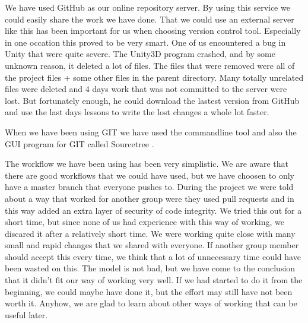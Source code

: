We have used GitHub \cite{GitHub} as our online repository server. By using
this service we could easily share the work we have done. That we could use
an external server like this has been important for us when choosing version
control tool. Especially in one occation this proved to be very smart. One of
us encountered a bug in Unity that were quite severe. The Unity3D program
crashed, and by some unknown reason, it deleted a lot of files. The files that
were removed were all of the project files + some other files in the parent
directory. Many totally unrelated files were deleted and 4 days work that was
not committed to the server were lost. But fortunately enough, he could
download the lastest version from GitHub and use the last days lessons to write
the lost changes a whole lot faster.

When we have been using GIT we have used the commandline tool and also the GUI
program for GIT called Sourcetree \cite{SourceTree}.

The workflow we have been using has been very simplistic. We are aware that
there are good workflows that we could have used, but we have choosen to only
have a master branch that everyone pushes to. During the project we were told
about a way that worked for another group were they used pull requests and in
this way added an extra layer of security of code integrity. We tried this out
for a short time, but since none of us had experience with this way of working,
we discared it after a relatively short time. We were working quite close with
many small and rapid changes that we shared with everyone. If another group
member should accept this every time, we think that a lot of unnecessary time
could have been wasted on this. The model is not bad, but we have come to the
conclusion that it didn't fit our way of working very well. If we had started 
to do it from the beginning, we could maybe have done it, but the effort may
still have not been worth it. Anyhow, we are glad to learn about other ways of
working that can be useful later.